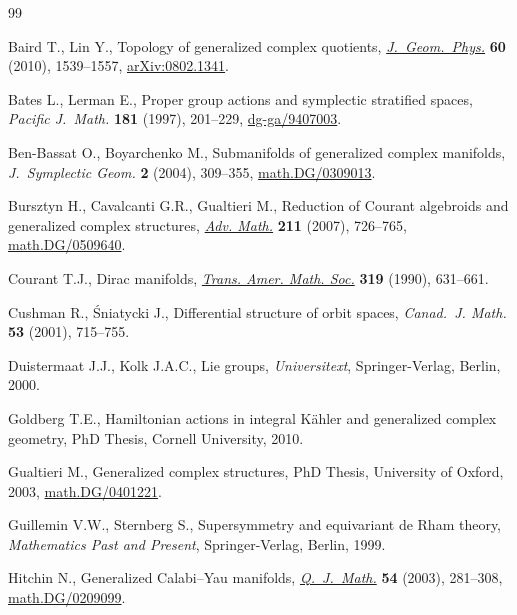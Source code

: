 \documentclass[pdftex]{sigma}
\numberwithin{equation}{section}
\begin{document}
\begin{thebibliography}{99}

\footnotesize\itemsep=0pt

Baird T., Lin Y.,
Topology of generalized complex quotients,
\href{http://dx.doi.org/10.1016/j.geomphys.2010.05.002}{{\it J.~Geom.~Phys.}} {\bf 60} (2010), 1539--1557,
\href{http://arxiv.org/abs/0802.1341}{arXiv:0802.1341}.

Bates L., Lerman E.,
Proper group actions and symplectic stratif\/ied spaces,
{\it Pacific J.~Math.} {\bf 181} (1997), 201--229,
\href{http://arxiv.org/abs/dg-ga/9407003}{dg-ga/9407003}.

Ben-Bassat O., Boyarchenko M.,
Submanifolds of generalized complex manifolds,
{\it J.~Symplectic Geom.} {\bf 2} (2004), 309--355,
\href{http://arxiv.org/abs/math.DG/0309013}{math.DG/0309013}.

Bursztyn H., Cavalcanti G.R., Gualtieri M.,
Reduction of Courant algebroids and generalized complex structures,
\href{http://dx.doi.org/10.1016/j.aim.2006.09.008}{{\it Adv. Math.}} {\bf 211} (2007), 726--765,
\href{http://arxiv.org/abs/math.DG/0509640}{math.DG/0509640}.

Courant T.J.,
Dirac manifolds,
\href{http://dx.doi.org/10.2307/2001258}{{\it Trans. Amer. Math. Soc.}} {\bf 319} (1990), 631--661.

Cushman R., {\'S}niatycki J.,
Dif\/ferential structure of orbit spaces,
{\it Canad.~J. Math.} {\bf 53} (2001), 715--755.

Duistermaat J.J., Kolk J.A.C.,
Lie groups, {\it Universitext}, Springer-Verlag, Berlin, 2000.

Goldberg T.E.,
Hamiltonian actions in integral K\"ahler and generalized complex geometry,
PhD Thesis, Cornell University, 2010.

Gualtieri M.,
Generalized complex structures,
PhD Thesis,
University of Oxford,
2003,
\href{http://arxiv.org/abs/math.DG/0401221}{math.DG/0401221}.

Guillemin V.W., Sternberg S.,
Supersymmetry and equivariant de Rham theory,
{\it Mathematics Past and Present},
Springer-Verlag,
Berlin,
1999.

Hitchin N.,
Generalized Calabi--Yau manifolds,
\href{http://dx.doi.org/10.1093/qjmath/54.3.281}{{\it Q.~J.~Math.}} {\bf 54} (2003), 281--308,
\href{http://arxiv.org/abs/math.DG/0209099}{math.DG/0209099}.


\end{thebibliography}
\end{document}
